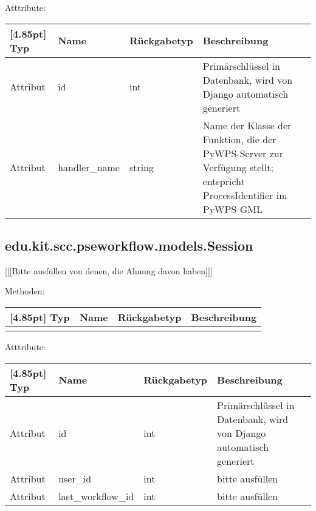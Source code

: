 			Atttribute:
			\begin{center}
				\setlength\tabcolsep{5pt}
				\renewcommand{\arraystretch}{1.5}
				
				\begin{tabularx}{\textwidth}{|l|l|l|X|}
					\hline
					\rowcolor[gray]{0.75}[4.85pt]
					Typ & Name & Rückgabetyp & Beschreibung \\ \hline 
					Attribut & id & int & Primärschlüssel in Datenbank, wird von Django automatisch generiert \\ \hline
					Attribut & handler\_name & string & Name der Klasse der Funktion, die der PyWPS-Server zur Verfügung stellt; entspricht ProcessIdentifier im PyWPS GML \\
					\hline
				\end{tabularx}
			\end{center}
		
		
		\subsection{edu.kit.scc.pseworkflow.models.Session}
			[[[Bitte ausfüllen von denen, die Ahnung davon haben]]]
			
			Methoden:
			\begin{center}
				\setlength\tabcolsep{5pt}
				\renewcommand{\arraystretch}{1.5}
				
				\begin{tabularx}{\textwidth}{|l|l|l|X|}
					\hline
					\rowcolor[gray]{0.75}[4.85pt]
					Typ & Name & Rückgabetyp & Beschreibung \\ \hline 
					&&& \\
					\hline
				\end{tabularx}
			\end{center}
			
			Atttribute:
			\begin{center}
				\setlength\tabcolsep{5pt}
				\renewcommand{\arraystretch}{1.5}
				
				\begin{tabularx}{\textwidth}{|l|l|l|X|}
					\hline
					\rowcolor[gray]{0.75}[4.85pt]
					Typ & Name & Rückgabetyp & Beschreibung \\ \hline 
					Attribut & id & int & Primärschlüssel in Datenbank, wird von Django automatisch generiert \\ \hline
					Attribut & user\_id & int & bitte ausfüllen \\ \hline
					Attribut & last\_workflow\_id & int & bitte ausfüllen \\
					\hline
				\end{tabularx}
			\end{center}
		
